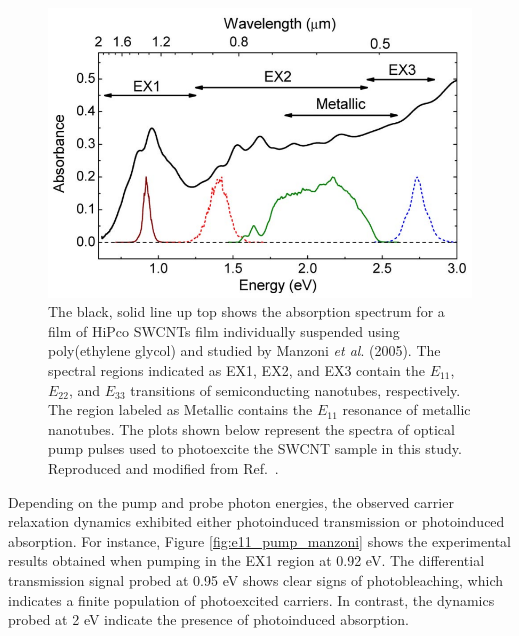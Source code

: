 \begin{figure}[H]
	\centering
	\includegraphics[scale=0.45]{images/chapter_prior_works/abs_manzoni}
	\caption{The black, solid line up top shows the absorption spectrum for a film of HiPco SWCNTs film individually suspended using poly(ethylene glycol) and studied by Manzoni \textit{et al}. (2005). The spectral regions indicated as EX1, EX2, and EX3 contain the $E_{11}$, $E_{22}$, and $E_{33}$ transitions of semiconducting nanotubes, respectively. The region labeled as Metallic contains the $E_{11}$ resonance of metallic nanotubes. The plots shown below represent the spectra of optical pump pulses used to photoexcite the SWCNT sample in this study. Reproduced and modified from Ref.\ \cite{manzoni2005intersubband}.}
	\label{fig:abs_manzoni}
\end{figure}

Depending on the pump and probe photon energies, the observed carrier relaxation dynamics exhibited either photoinduced transmission or photoinduced absorption. For instance, Figure \ref{fig:e11_pump_manzoni} shows the experimental results obtained when pumping in the EX1 region at 0.92 eV. The differential transmission signal probed at 0.95 eV shows clear signs of photobleaching, which indicates a finite population of photoexcited carriers. In contrast, the dynamics probed at 2 eV indicate the presence of photoinduced absorption.

